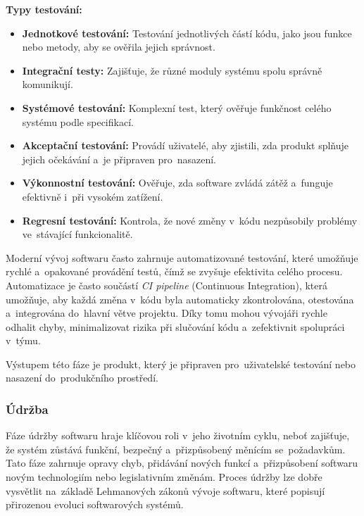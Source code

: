 \documentclass[male,czech,api_bc]{kitheses}
\begin{document}
\textbf{Typy testování:}
\begin{itemize}
	\item \textbf{Jednotkové testování:} Testování jednotlivých částí kódu, jako jsou funkce nebo metody, aby se ověřila jejich správnost.
	\item \textbf{Integrační testy:} Zajišťuje, že různé moduly systému spolu správně komunikují.
	\item \textbf{Systémové testování:} Komplexní test, který ověřuje funkčnost celého systému podle specifikací.
	\item \textbf{Akceptační testování:} Provádí uživatelé, aby zjistili, zda produkt splňuje jejich očekávání a~je připraven pro~nasazení.
	\item \textbf{Výkonnostní testování:} Ověřuje, zda software zvládá zátěž a~funguje efektivně i~při vysokém zatížení.
	\item \textbf{Regresní testování:} Kontrola, že nové změny v~kódu nezpůsobily problémy ve~stávající funkcionalitě.
\end{itemize}

Moderní vývoj softwaru často zahrnuje automatizované testování, které umožňuje rychlé a~opakované provádění testů, čímž se zvyšuje efektivita celého procesu. Automatizace je často součástí \textit{CI pipeline} (Continuous Integration), která umožňuje, aby každá změna v~kódu byla automaticky zkontrolována, otestována a~integrována do~hlavní větve projektu. Díky tomu mohou vývojáři rychle odhalit chyby, minimalizovat rizika při slučování kódu a~zefektivnit spolupráci v~týmu.\cite{testing}

Výstupem této fáze je produkt, který je připraven pro~uživatelské testování nebo nasazení do~produkčního prostředí.

\subsubsection{Údržba}

Fáze údržby softwaru hraje klíčovou roli v~jeho životním cyklu, neboť zajišťuje, že systém zůstává funkční, bezpečný a~přizpůsobený měnícím se~požadavkům. Tato fáze zahrnuje opravy chyb, přidávání nových funkcí a~přizpůsobení softwaru novým technologiím nebo legislativním změnám. Proces údržby lze dobře vysvětlit na~základě Lehmanových zákonů vývoje softwaru, které popisují přirozenou evoluci softwarových systémů.
\end{document}
